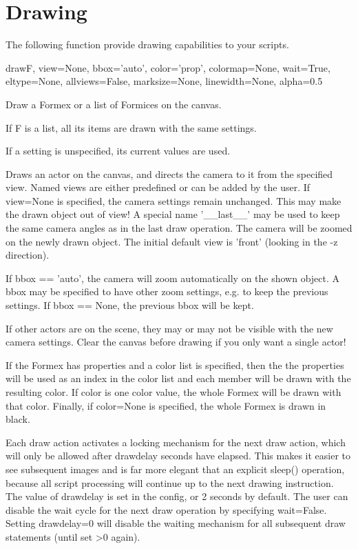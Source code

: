 

\section{Drawing}
\label{sec:drawing}

The following function provide drawing capabilities to your scripts.

 
\begin{funcdesc}{draw}{F, view=None, bbox='auto', color='prop', colormap=None, wait=True, eltype=None, allviews=False, marksize=None, linewidth=None, alpha=0.5}

Draw a Formex or a list of Formices on the canvas.

    If F is a list, all its items are drawn with the same settings.

    If a setting is unspecified, its current values are used.
    
    Draws an actor on the canvas, and directs the camera to it from
    the specified view. Named views are either predefined or can be added by
    the user.
    If view=None is specified, the camera settings remain unchanged.
    This may make the drawn object out of view!
    A special name '__last__' may be used to keep the same camera angles
    as in the last draw operation. The camera will be zoomed on the newly
    drawn object.
    The initial default view is 'front' (looking in the -z direction).

    If bbox == 'auto', the camera will zoom automatically on the shown
    object. A bbox may be specified to have other zoom settings, e.g. to
    keep the previous settings. If bbox == None, the previous bbox will be
    kept.

    If other actors are on the scene, they may or may not be visible with the
    new camera settings. Clear the canvas before drawing if you only want
    a single actor!

    If the Formex has properties and a color list is specified, then the
    the properties will be used as an index in the color list and each member
    will be drawn with the resulting color.
    If color is one color value, the whole Formex will be drawn with
    that color.
    Finally, if color=None is specified, the whole Formex is drawn in black.
    
    Each draw action activates a locking mechanism for the next draw action,
    which will only be allowed after drawdelay seconds have elapsed. This
    makes it easier to see subsequent images and is far more elegant that an
    explicit sleep() operation, because all script processing will continue
    up to the next drawing instruction.
    The value of drawdelay is set in the config, or 2 seconds by default.
    The user can disable the wait cycle for the next draw operation by
    specifying wait=False. Setting drawdelay=0 will disable the waiting
    mechanism for all subsequent draw statements (until set >0 again).

\end{funcdesc}

